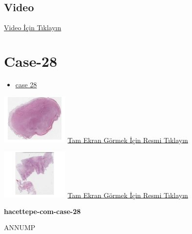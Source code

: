 \documentclass[
  letterpaper,
  DIV=11,
  numbers=noendperiod]{scrreprt}
\providecommand{\tightlist}{%
  \setlength{\itemsep}{0pt}\setlength{\parskip}{0pt}}\usepackage{longtable,booktabs,array}
\begin{document}
\hypertarget{video-25}{%
\subsection{Video}\label{video-25}}

\href{https://www.youtube.com/watch?v=c2ePAdTH00g}{Video İçin Tıklayın}

\hypertarget{sec-hacettepe-case-of-the-month-case-28}{%
\section{Case-28}\label{sec-hacettepe-case-of-the-month-case-28}}

\begin{itemize}
\tightlist
\item
  \href{https://www.youtube.com/watch?v=yUrabUzw3RI\&ab_channel=KemalKosemehmetoglu}{case
  28}
\end{itemize}

\href{https://images.patolojiatlasi.com/hacettepe-com-case-28/HE1.html}{\includegraphics[width=0.25\textwidth,height=\textheight]{./screenshots/thumbnail_hacettepe-com-case-28-1.png}}
\href{https://images.patolojiatlasi.com/hacettepe-com-case-28/HE1.html}{Tam
Ekran Görmek İçin Resmi Tıklayın}

\href{https://images.patolojiatlasi.com/hacettepe-com-case-28/HE2.html}{\includegraphics[width=0.25\textwidth,height=\textheight]{./screenshots/thumbnail_hacettepe-com-case-28-2.png}}
\href{https://images.patolojiatlasi.com/hacettepe-com-case-28/HE2.html}{Tam
Ekran Görmek İçin Resmi Tıklayın}

\textbf{hacettepe-com-case-28}

\begin{tcolorbox}[enhanced jigsaw, colbacktitle=quarto-callout-tip-color!10!white, colback=white, titlerule=0mm, opacityback=0, colframe=quarto-callout-tip-color-frame, opacitybacktitle=0.6, bottomrule=.15mm, breakable, coltitle=black, title=\textcolor{quarto-callout-tip-color}{\faLightbulb}\hspace{0.5em}{Tanı}, toprule=.15mm, toptitle=1mm, bottomtitle=1mm, arc=.35mm, rightrule=.15mm, leftrule=.75mm, left=2mm]

ANNUMP

\end{tcolorbox}
\end{document}
